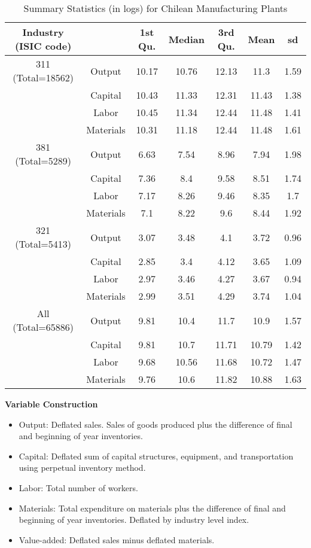 \documentclass[12pt]{article}
\begin{document}
\begin{appendices}
\begin{table}[H]
\centering
\caption{Summary Statistics (in logs) for Chilean Manufacturing Plants}
\small
\begin{tabular}{ccccccc}
  \hline\hline Industry (ISIC code) &   & 1st Qu. & Median & 3rd Qu. & Mean & sd \\ 
  \hline
311 (Total=18562) & Output & 10.17 & 10.76 & 12.13 & 11.3 & 1.59 \\ 
   & Capital & 10.43 & 11.33 & 12.31 & 11.43 & 1.38 \\ 
   & Labor & 10.45 & 11.34 & 12.44 & 11.48 & 1.41 \\ 
   & Materials & 10.31 & 11.18 & 12.44 & 11.48 & 1.61 \\ 
  381 (Total=5289) & Output & 6.63 & 7.54 & 8.96 & 7.94 & 1.98 \\ 
   & Capital & 7.36 & 8.4 & 9.58 & 8.51 & 1.74 \\ 
   & Labor & 7.17 & 8.26 & 9.46 & 8.35 & 1.7 \\ 
   & Materials & 7.1 & 8.22 & 9.6 & 8.44 & 1.92 \\ 
  321 (Total=5413) & Output & 3.07 & 3.48 & 4.1 & 3.72 & 0.96 \\ 
   & Capital & 2.85 & 3.4 & 4.12 & 3.65 & 1.09 \\ 
   & Labor & 2.97 & 3.46 & 4.27 & 3.67 & 0.94 \\ 
   & Materials & 2.99 & 3.51 & 4.29 & 3.74 & 1.04 \\ 
  All (Total=65886) & Output & 9.81 & 10.4 & 11.7 & 10.9 & 1.57 \\ 
   & Capital & 9.81 & 10.7 & 11.71 & 10.79 & 1.42 \\ 
   & Labor & 9.68 & 10.56 & 11.68 & 10.72 & 1.47 \\ 
   & Materials & 9.76 & 10.6 & 11.82 & 10.88 & 1.63 \\ 
   \hline
\end{tabular}
\label{CHLsum}
\end{table}

\textbf{Variable Construction}
\begin{itemize}
	\item Output: Deflated sales. Sales of goods produced plus the difference of final and beginning of year inventories.
	\item Capital: Deflated sum of capital structures, equipment, and transportation using perpetual inventory method.
	\item Labor: Total number of workers.
	\item Materials: Total expenditure on materials plus the difference of final and beginning of year inventories. Deflated by industry level index.
	\item Value-added: Deflated sales minus deflated materials.
\end{itemize}


\end{appendices}
\end{document}
